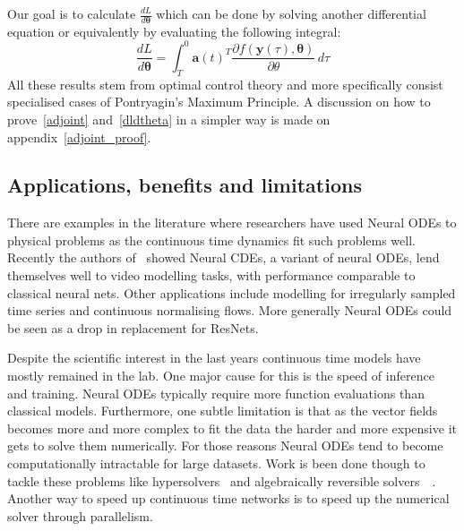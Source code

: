 \documentclass{article}
\begin{document}
    Our goal is to calculate $\frac{dL}{d\pmb{\theta}}$ which can be done by solving another differential equation or equivalently by evaluating the following integral:
    \begin{equation}
        \frac{dL}{d\pmb{\theta}}
        = \int_T^0
        \pmb{a}(t)^T
        \frac
        {\partial f(\pmb{y}(\tau), \pmb{\theta})}
        {\partial \theta}
        \, d\tau
        \label{dldtheta}
    \end{equation}
    All these results stem from optimal control theory and more specifically consist specialised cases of Pontryagin's Maximum Principle.
    A discussion on how to prove~\eqref{adjoint} and~\eqref{dldtheta} in a simpler way is made on appendix~\ref{adjoint_proof}.

    \subsection{Applications, benefits and limitations}
    There are examples in the literature where researchers have used Neural ODEs to physical problems as the continuous time dynamics fit such problems well.
    Recently the authors of~\cite{chiu2023exploiting} showed Neural CDEs, a variant of neural ODEs, lend themselves well to video modelling tasks, with performance comparable to classical neural nets.
    Other applications include modelling for irregularly sampled time series and continuous normalising flows.
    More generally Neural ODEs could be seen as a drop in replacement for ResNets.

    Despite the scientific interest in the last years continuous time models have mostly remained in the lab.
    One major cause for this is the speed of inference and training.
    Neural ODEs typically require more function evaluations than classical models.
    Furthermore, one subtle limitation is that as the vector fields becomes more and more complex to fit the data the harder and more expensive it gets to solve them numerically.
    For those reasons Neural ODEs tend to become computationally intractable for large datasets.
    Work is been done though to tackle these problems like hypersolvers~\cite{poli2020hypersolvers} and algebraically reversible solvers~\cite{kidger2021efficient}~\cite{zhuang2021mali}.
    Another way to speed up continuous time networks is to speed up the numerical solver through parallelism.
\end{document}
